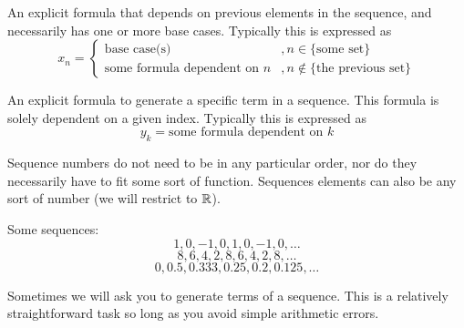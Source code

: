 \documentclass[main.tex]{subfiles}
\begin{document}
\begin{defn}
	An explicit formula that depends on previous elements in the sequence, and necessarily has one or more base cases. Typically this is expressed as \[x_n = \begin{cases} \text{base case(s)} &, n \in \{\text{some set}\} \\ \text{some formula dependent on } n &, n \not\in \{\text{the previous set}\} \end{cases}\]
\end{defn}

\begin{defn}
	An explicit formula to generate a specific term in a sequence. This formula is solely dependent on a given index. Typically this is expressed as \[y_k = \text{some formula dependent on } k\]
\end{defn}

\begin{rem}
	Sequence numbers do not need to be in any particular order, nor do they necessarily have to fit some sort of function. Sequences elements can also be any sort of number (we will restrict to \(\mathbb{R}\)).
\end{rem}

\begin{example}
	Some sequences:
	\[1, 0, -1, 0, 1, 0, -1, 0, \dots\]
	\[8, 6, 4, 2, 8, 6, 4, 2, 8, \dots\]
	\[0, 0.5, 0.333, 0.25, 0.2, 0.125, \dots\]
\end{example}

Sometimes we will ask you to generate terms of a sequence. This is a relatively straightforward task so long as you avoid simple arithmetic errors. 

\end{document}
